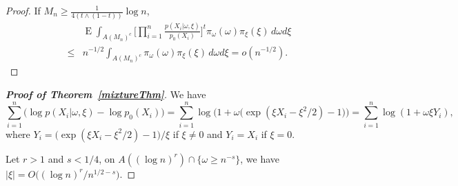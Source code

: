 \documentclass[11pt]{article}
\DeclareMathOperator{\myE}{E}
\theoremstyle{plain}
\theoremstyle{definition}
\theoremstyle{remark}
\begin{document}
\begin{appendices}
\begin{proof}
If $M_n \geq \frac{1}{4(t\wedge (1-t))}\log n$,
\begin{align*}
    &\myE \int_{A(M_n)^c} \Big[\prod_{i=1}^n \frac{p(X_i|\omega,\xi)}{p_0(X_i)}\Big]^t \pi_{\omega}(\omega)\pi_{\xi}(\xi)\, d\omega d\xi
\\
    \leq
    &
    n^{-1/2}
    \int_{A(M_n)^c} 
\pi_{\omega}(\omega) \pi_\xi(\xi)\, d\omega d\xi
=o(n^{-1/2}).
\end{align*}




\end{proof}


\begin{proof}[\textbf{Proof of Theorem~\ref{mixtureThm}}]
We have
\begin{equation*}
    \sum_{i=1}^n \big(\log p(X_i|\omega,\xi)-\log p_0(X_i)\big)
    =\sum_{i=1}^n \log\Big(1+\omega \big(\exp(\xi X_i -\xi^2/2)-1\big)\Big)=\sum_{i=1}^n \log(1+\omega \xi Y_i),
\end{equation*}
where
$
Y_i=\big(\exp(\xi X_i -\xi^2/2)-1\big)/\xi
$ if $\xi \neq 0$ and $Y_i=X_i$ if $\xi =0$.

Let $r>1$ and $s< 1/4$, on $A((\log n)^r)\cap \{\omega\geq n^{-s}\}$,
we have $|\xi| = O\big((\log n)^{r}/n^{1/2-s}\big)$.


\end{proof}
\end{appendices}
\end{document}
